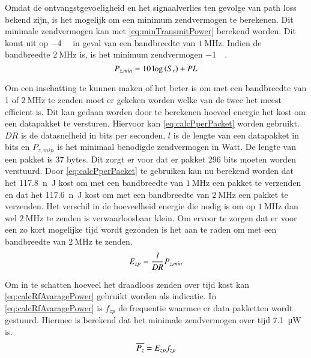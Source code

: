 Omdat de ontvangstgevoeligheid en het signaalverlies ten gevolge van path loss bekend zijn, is het mogelijk om een minimum zendvermogen te berekenen. Dit minimale zendvermogen kan met \cref{eq:minTransmitPower} berekend worden. Dit komt uit op \qty{-4}{\deci\belmilliwatt} in geval van een bandbreedte van $\SI{1}{\mega\hertz}$. Indien de bandbreedte $\SI{2}{\mega\hertz}$ is, is het minimum zendvermogen \qty{-1}{\deci\belmilliwatt}.
\begin{equation}\label{eq:minTransmitPower}
    P_{z,min}= 10\log\left(S_r\right) + PL
    \tagaddtext{[\si{\deci\belmilliwatt}]}
\end{equation}

Om een inschatting te kunnen maken of het beter is om met een bandbreedte van 1 of $\SI{2}{\mega\hertz}$ te zenden moet er gekeken worden welke van de twee het meest efficient is. Dit kan gedaan worden door te berekenen hoeveel energie het kost om een datapakket te versturen. Hiervoor kan \cref{eq:calcPperPacket} worden gebruikt. $DR$ is de datasnelheid in bits per seconden, $l$ is de lengte van een datapakket in bits en $P_{z,min}$ is het minimaal benodigde zendvermogen in Watt. De lengte van een pakket is 37 bytes. Dit zorgt er voor dat er pakket 296 bits moeten worden verstuurd. Door \cref{eq:calcPperPacket} te gebruiken kan nu berekend worden dat het \qty{117.8}{n\joule} kost om met een bandbreedte van $\SI{1}{\mega\hertz}$ een pakket te verzenden en dat het \qty{117.6}{n\joule} kost om met een bandbreedte van $\SI{2}{\mega\hertz}$ een pakket te verzenden. Het verschil in de hoeveelheid energie die nodig is om op $\SI{1}{\mega\hertz}$ dan wel $\SI{2}{\mega\hertz}$ te zenden is verwaarloosbaar klein. Om ervoor te zorgen dat er voor een zo kort mogelijke tijd wordt gezonden is het aan te raden om met een bandbreedte van $\SI{2}{\mega\hertz}$ te zenden.
\begin{equation}\label{eq:calcPperPacket}
    E_{zp}=\frac{l}{DR}P_{z,min}
    \tagaddtext{[\si{\joule}]}
\end{equation}

Om in te schatten hoeveel het draadloos zenden over tijd kost kan \cref{eq:calcRfAvaragePower} gebruikt worden als indicatie. In \cref{eq:calcRfAvaragePower} is $f_{zp}$ de frequentie waarmee er data pakketten wordt gestuurd. Hiermee is berekend dat het minimale zendvermogen over tijd \qty{7.1}{\micro\watt} is.
\begin{equation}\label{eq:calcRfAvaragePower}
    \overline{P_{z}}=E_{zp}f_{zp}
    \tagaddtext{[\si{\watt}]}
\end{equation}




